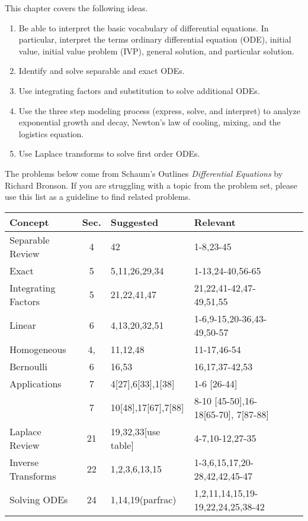 
\noindent This chapter covers the following ideas.

\begin{enumerate}
\item Be able to interpret the basic vocabulary of differential equations. In particular, interpret the terms ordinary differential equation (ODE), initial value, initial value problem (IVP), general solution, and particular solution.
\item Identify and solve separable and exact ODEs. 
\item Use integrating factors and substitution to solve additional ODEs.
\item Use the three step modeling process (express, solve, and interpret) to analyze exponential growth and decay, Newton's law of cooling, mixing, and the logistics equation. 
\item Use Laplace transforms to solve first order ODEs.
\end{enumerate}

The problems below come from Schaum's Outlines \textit{Differential Equations} by Richard Bronson. If you are struggling with a topic from the problem set, please use this list as a guideline to find related problems.

\begin{center}

\begin{tabular}{|l|c|l|l|l|l|}
\hline
Concept	&Sec.	&Suggested	&Relevant	\\\hline
Separable Review&4 & 42 &1-8,23-45	\\\hline
Exact &5 & 5,11,26,29,34& 1-13,24-40,56-65	\\\hline
Integrating Factors&5 & 21,22,41,47 & 21,22,41-42,47-49,51,55	\\\hline
Linear&6 &4,13,20,32,51 & 1-6,9-15,20-36,43-49,50-57	\\\hline
Homogeneous&4, &11,12,48 &11-17,46-54	\\\hline
Bernoulli &6 & 16,53& 16,17,37-42,53	\\\hline
Applications&7 &4[27],6[33],1[38] & 1-6 [26-44]	\\
&7 &10[48],17[67],7[88] & 8-10 [45-50],16-18[65-70], 7[87-88]	\\\hline
Laplace Review &21 & 19,32,33[use table] & 4-7,10-12,27-35	\\\hline
Inverse Transforms &22 & 1,2,3,6,13,15 & 1-3,6,15,17,20-28,42,42,45-47	\\\hline
Solving ODEs &24 & 1,14,19(parfrac) & 1,2,11,14,15,19-19,22,24,25,38-42 	\\\hline
\end{tabular}
\end{center}
